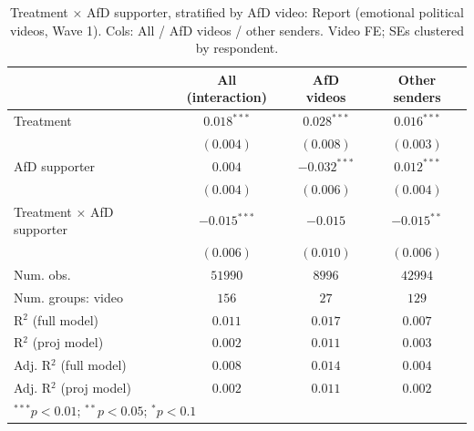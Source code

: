 
\begin{table}
\begin{center}
\begin{tabular}{l c c c}
\hline
 & All (interaction) & AfD videos & Other senders \\
\hline
Treatment                 & $0.018^{***}$  & $0.028^{***}$  & $0.016^{***}$ \\
                          & $(0.004)$      & $(0.008)$      & $(0.003)$     \\
AfD supporter             & $0.004$        & $-0.032^{***}$ & $0.012^{***}$ \\
                          & $(0.004)$      & $(0.006)$      & $(0.004)$     \\
Treatment × AfD supporter & $-0.015^{***}$ & $-0.015$       & $-0.015^{**}$ \\
                          & $(0.006)$      & $(0.010)$      & $(0.006)$     \\
\hline
Num. obs.                 & $51990$        & $8996$         & $42994$       \\
Num. groups: video        & $156$          & $27$           & $129$         \\
R$^2$ (full model)        & $0.011$        & $0.017$        & $0.007$       \\
R$^2$ (proj model)        & $0.002$        & $0.011$        & $0.003$       \\
Adj. R$^2$ (full model)   & $0.008$        & $0.014$        & $0.004$       \\
Adj. R$^2$ (proj model)   & $0.002$        & $0.011$        & $0.002$       \\
\hline
\multicolumn{4}{l}{\scriptsize{$^{***}p<0.01$; $^{**}p<0.05$; $^{*}p<0.1$}}
\end{tabular}
\caption{Treatment × AfD supporter, stratified by AfD video: Report (emotional political videos, Wave 1). Cols: All / AfD videos / other senders. Video FE; SEs clustered by respondent.}
\label{tab:afd_video_hetero_report}
\end{center}
\end{table}
